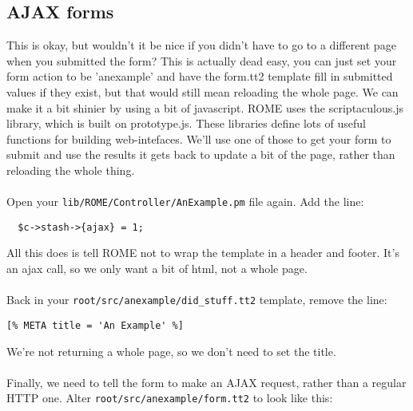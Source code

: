 \subsection{AJAX forms}
This is okay, but wouldn't it be nice if you didn't have to go to a different page when you submitted the form? This is actually dead easy, you can just set your form action to be 'anexample' and have the form.tt2 template fill in submitted values if they exist, but that would still mean reloading the whole page. We can make it a bit shinier by using a bit of javascript. ROME uses the scriptaculous.js library, which is built on prototype.js. These libraries define lots of useful functions for building web-intefaces. We'll use one of those to get your form to submit and use the results it gets back to update a bit of the page, rather than reloading the whole thing.

\paragraph*{}
Open your \verb|lib/ROME/Controller/AnExample.pm| file again. Add the line:

\begin{verbatim}
  $c->stash->{ajax} = 1;
\end{verbatim}

All this does is tell ROME not to wrap the template in a header and footer. It's an ajax call, so we only want a bit of html, not a whole page. 

\paragraph*{}
Back in your \verb|root/src/anexample/did_stuff.tt2| template, remove the line:

\begin{verbatim}
[% META title = 'An Example' %]
\end{verbatim}

We're not returning a whole page, so we don't need to set the title.

\paragraph*{}
Finally, we need to tell the form to make an AJAX request, rather than a regular HTTP one. Alter  \verb|root/src/anexample/form.tt2| to look like this:

